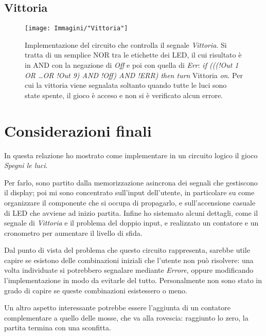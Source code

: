 \documentclass[11pt]{article}
\begin{document}
\subsection{Vittoria}

\begin{figure}[H]
\centering
\texttt{[image: Immagini/"Vittoria"]}
\caption{{\small Implementazione del circuito che controlla il segnale {\itshape Vittoria}. Si tratta di un semplice NOR tra le etichette dei LED, il cui risultato è in AND con la negazione di {\itshape Off} e poi con quella di {\itshape Err}:
{\itshape if (((!Out 1 OR \dots OR !Out 9) AND !Off) AND !ERR) then turn} Vittoria {\itshape on}.
Per cui la vittoria viene segnalata soltanto quando tutte le luci sono state spente, il gioco è acceso e non si è verificato alcun errore.}}
\label{fig:vittoria}
\end{figure}


\section{Considerazioni finali}
\label{sec:considerazionifinali}

In questa relazione ho mostrato come implementare in un circuito logico il gioco {\itshape Spegni le luci}.

Per farlo, sono partito dalla memorizzazione asincrona dei segnali che gestiscono il display; poi mi sono concentrato sull'input dell'utente, in particolare su come organizzare il componente che si occupa di propagarlo, e sull'accensione casuale di LED che avviene ad inizio partita. Infine ho sistemato alcuni dettagli, come il segnale di {\itshape Vittoria} e il problema del doppio input, e realizzato un contatore e un cronometro per aumentare il livello di sfida.

Dal punto di vista del problema che questo circuito rappresenta, sarebbe utile capire se esistono delle combinazioni iniziali che l'utente non può risolvere: una volta individuate si potrebbero segnalare mediante {\itshape Errore}, oppure modificando l'implementazione in modo da evitarle del tutto. Personalmente non sono stato in grado di capire se queste combinazioni esistessero o meno.

Un altro aspetto interessante potrebbe essere l'aggiunta di un contatore complementare a quello delle mosse, che va alla rovescia: raggiunto lo zero, la partita termina con una sconfitta. 
\end{document}
